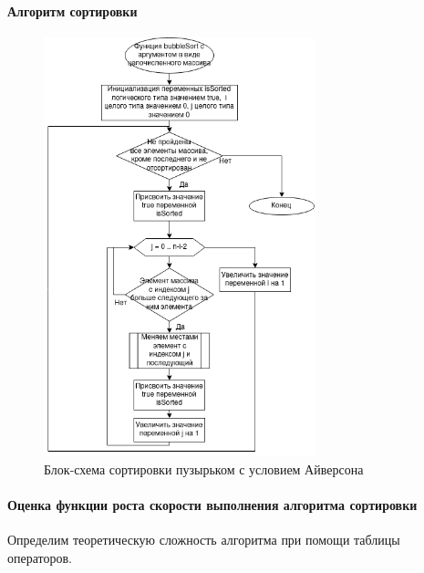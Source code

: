 \documentclass[a4paper, 14pt]{extarticle}
\begin{document}
\paragraph{Алгоритм сортировки}
\begin{figure}[htpb]
  \centering
  \includegraphics[width=0.7\textwidth]{pictures/first_sort_flowchart.png}
  \caption{Блок-схема сортировки пузырьком с условием Айверсона}
  \label{fig:first_sort_flow}
\end{figure}
\newpage
\paragraph{Оценка функции роста скорости выполнения алгоритма сортировки}
Определим теоретическую сложность алгоритма при помощи таблицы
операторов.
\end{document}
